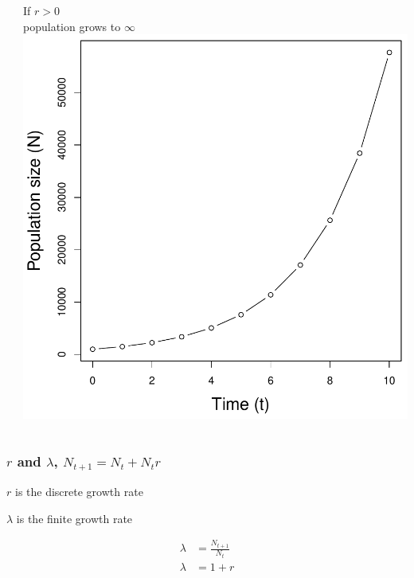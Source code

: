 \documentclass[color=usenames,dvipsnames]{beamer}\usepackage[]{graphicx}\usepackage[]{xcolor}
\begin{document}
\begin{frame}
\begin{columns}
\begin{column}{0.33\textwidth}
    \end{column}
    \begin{column}{0.33\textwidth}
      \small
      \centering
      If $r > 0$ \\ population grows to $\infty$ \\
      \includegraphics[width=\textwidth]{figs/rg0}
    \end{column}
  \end{columns}
\end{frame}







\begin{frame}
  \frametitle{$r$ and $\lambda$, $N_{t+1} = N_t + N_tr$}
  \Large
  $r$ is the discrete growth rate \par
  \vspace{0.5cm}
  $\lambda$ is the finite growth rate \par
  \begin{align*}
    \lambda &= \frac{N_{t+1}}{N_t} \\
    \lambda &= 1+r
  \end{align*}
\end{frame}
\end{document}
